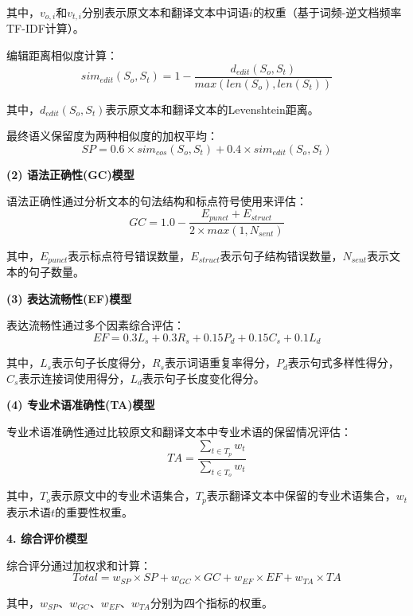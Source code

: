 \documentclass[bwprint]{cumcmthesis}
\begin{document}
其中，$v_{o,i}$和$v_{t,i}$分别表示原文本和翻译文本中词语$i$的权重（基于词频-逆文档频率TF-IDF计算）。

编辑距离相似度计算：
\begin{equation}
sim_{edit}(S_o, S_t) = 1 - \frac{d_{edit}(S_o, S_t)}{max(len(S_o), len(S_t))}
\end{equation}

其中，$d_{edit}(S_o, S_t)$表示原文本和翻译文本的Levenshtein距离。

最终语义保留度为两种相似度的加权平均：
\begin{equation}
SP = 0.6 \times sim_{cos}(S_o, S_t) + 0.4 \times sim_{edit}(S_o, S_t)
\end{equation}

\textbf{(2) 语法正确性(GC)模型}

语法正确性通过分析文本的句法结构和标点符号使用来评估：
\begin{equation}
GC = 1.0 - \frac{E_{punct} + E_{struct}}{2 \times max(1, N_{sent})}
\end{equation}

其中，$E_{punct}$表示标点符号错误数量，$E_{struct}$表示句子结构错误数量，$N_{sent}$表示文本的句子数量。

\textbf{(3) 表达流畅性(EF)模型}

表达流畅性通过多个因素综合评估：
\begin{equation}
EF = 0.3L_s + 0.3R_s + 0.15P_d + 0.15C_s + 0.1L_d
\end{equation}

其中，$L_s$表示句子长度得分，$R_s$表示词语重复率得分，$P_d$表示句式多样性得分，$C_s$表示连接词使用得分，$L_d$表示句子长度变化得分。

\textbf{(4) 专业术语准确性(TA)模型}

专业术语准确性通过比较原文和翻译文本中专业术语的保留情况评估：
\begin{equation}
TA = \frac{\sum_{t \in T_p} w_t}{\sum_{t \in T_o} w_t}
\end{equation}

其中，$T_o$表示原文中的专业术语集合，$T_p$表示翻译文本中保留的专业术语集合，$w_t$表示术语$t$的重要性权重。

\textbf{4. 综合评价模型}

综合评分通过加权求和计算：
\begin{equation}
Total = w_{SP} \times SP + w_{GC} \times GC + w_{EF} \times EF + w_{TA} \times TA
\end{equation}

其中，$w_{SP}$、$w_{GC}$、$w_{EF}$、$w_{TA}$分别为四个指标的权重。
\end{document}
